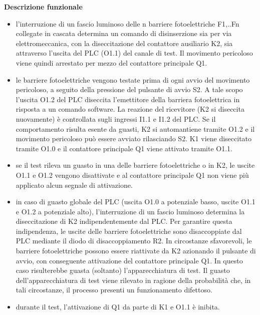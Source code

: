 \textbf{Descrizione funzionale}
\begin{itemize}
    \item l'interruzione di un fascio luminoso delle n barriere fotoelettriche F1,..Fn collegate in cascata determina un comando di disinserzione sia per via elettromeccanica, con la diseccitazione del contattore ausiliario K2, sia attraverso l'uscita del PLC (O1.1) del canale di test. Il movimento pericoloso viene quindi arrestato per mezzo del contattore principale Q1.
    \item le barriere fotoelettriche vengono testate prima di ogni avvio del movimento pericoloso, a seguito della pressione del pulsante di avvio S2. A tale scopo l'uscita O1.2 del PLC diseccita l'emettitore della barriera fotoelettrica in risposta a un comando software. La reazione del ricevitore (K2 si diseccita nuovamente) è controllata sugli ingressi I1.1 e I1.2 del PLC. Se il comportamento risulta esente da guasti, K2 si automantiene tramite O1.2 e il movimento pericoloso può essere avviato rilasciando S2. K1 viene diseccitato tramite O1.0 e il contattore principale Q1 viene attivato tramite O1.1.
    \item se il test rileva un guasto in una delle barriere fotoelettriche o in K2, le uscite O1.1 e O1.2 vengono disattivate e al contattore principale Q1 non viene più applicato alcun segnale di attivazione.
    \item in caso di guasto globale del PLC (uscita O1.0 a potenziale basso, uscite O1.1 e O1.2 a potenziale alto), l'interruzione di un fascio luminoso determina la diseccitazione di K2 indipendentemente dal PLC. Per garantire questa indipendenza, le uscite delle barriere fotoelettriche sono disaccoppiate dal PLC mediante il diodo di disaccoppiamento R2. In circostanze sfavorevoli, le barriere fotoelettriche possono essere riattivate da K2 azionando il pulsante di avvio, con conseguente attivazione del contattore principale Q1. In questo caso risulterebbe guasta (soltanto) l'apparecchiatura di test. Il guasto dell'apparecchiatura di test viene rilevato in ragione della probabilità che, in tali circostanze, il processo presenti un funzionamento difettoso.
    \item durante il test, l'attivazione di Q1 da parte di K1 e O1.1 è inibita.
\end{itemize}

